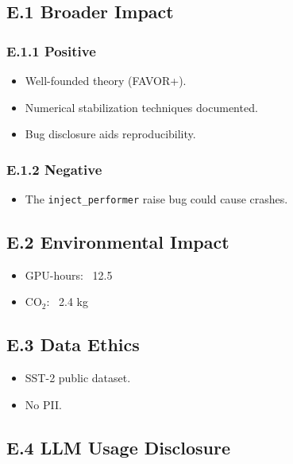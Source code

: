 \subsection{E.1 Broader Impact}

\subsubsection{E.1.1 Positive}

\begin{itemize}
\item Well-founded theory (FAVOR+).
\item Numerical stabilization techniques documented.
\item Bug disclosure aids reproducibility.

\end{itemize}
\subsubsection{E.1.2 Negative}

\begin{itemize}
\item The \texttt{inject\_performer} raise bug could cause crashes.

\end{itemize}
\subsection{E.2 Environmental Impact}

\begin{itemize}
\item GPU-hours: ~12.5
\item CO$_2$: ~2.4 kg

\end{itemize}
\subsection{E.3 Data Ethics}

\begin{itemize}
\item SST-2 public dataset.
\item No PII.

\end{itemize}
\subsection{E.4 LLM Usage Disclosure}

